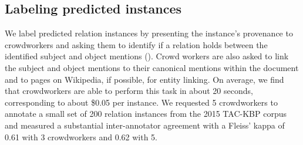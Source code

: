\subsection{Labeling predicted instances}
We label predicted relation instances by presenting the instance's provenance to crowdworkers
  and asking them to identify if a relation holds between the identified subject and object mentions (). 
  Crowd workers are also asked to link the subject and object mentions to their canonical mentions within the document and to pages on Wikipedia, if possible, for entity linking.
On average, we find that crowdworkers are able to perform this task in about 20 seconds, corresponding to about \$0.05 per instance.
We requested 5 crowdworkers to annotate a small set of 200 relation instances from the 2015 TAC-KBP corpus 
and measured a substantial inter-annotator agreement with a Fleiss' kappa of 0.61 with 3 crowdworkers and 0.62 with 5. %

